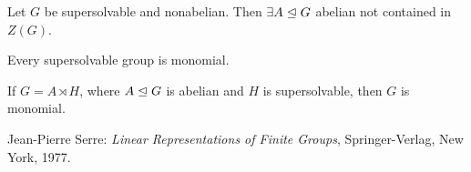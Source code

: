 \documentclass{article}
\begin{document}
\begin{multicols*}{2}
\begin{lemm}
Let $G$ be supersolvable and nonabelian. Then $\exists A \trianglelefteq G$ abelian not contained in $Z(G)$.
\end{lemm}

\begin{thm}
Every supersolvable group is monomial.
\end{thm}
\begin{cor}If $G = A \rtimes H$, where $A \trianglelefteq G$ is abelian and $H$ is supersolvable, then $G$ is monomial.

\end{cor}

\begin{thebibliography}{widest-label} %
	Jean-Pierre Serre:
	\emph{Linear Representations of Finite Groups}, Springer-Verlag, New York, 1977.

\end{thebibliography}
\end{multicols*}
\end{document}
